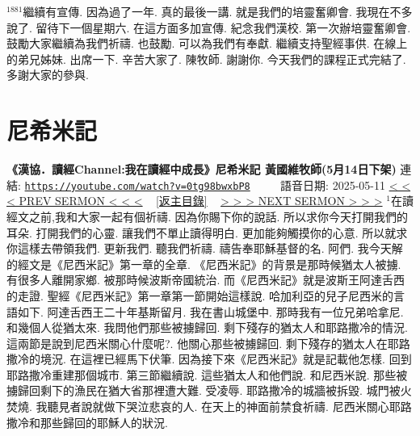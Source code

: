 \documentclass{book}
\begin{document}
$^{1881}$繼續有宣傳.
因為過了一年.
真的最後一講.
就是我們的培靈奮卿會.
我現在不多說了.
留待下一個星期六.
在這方面多加宣傳.
紀念我們漢校.
第一次辦培靈奮卿會.
鼓勵大家繼續為我們祈禱.
也鼓勵.
可以為我們有奉獻.
繼續支持聖經事供.
在線上的弟兄姊妹.
出席一下.
辛苦大家了.
陳牧師.
謝謝你.
今天我們的課程正式完結了.
多謝大家的參與.
\newpage



\section{尼希米記}
\label{sec:0tg98bwxbP8}
\textbf{《漢協．讀經Channel:我在讀經中成長》尼希米記 黃國維牧師(5月14日下架)}
\newline
\newline
連結: \href{https://youtube.com/watch?v=0tg98bwxbP8}{\texttt{https://youtube.com/watch?v=0tg98bwxbP8}} ~~~~ 語音日期: 2025-05-11
\newline
\newline
\hyperref[sec:y7RfxilxFdE]{\small{< < < PREV SERMON < < <}}
~
\hyperref[sec:index]{\small{[返主目錄]}}
~
\hyperref[sec:ToDbLeyWzNI]{\small{> > > NEXT SERMON > > >}}
\newline
\newline
$^{1}$在讀經文之前,我和大家一起有個祈禱.
因為你賜下你的說話.
所以求你今天打開我們的耳朵.
打開我們的心靈.
讓我們不單止讀得明白.
更加能夠觸摸你的心意.
所以就求你這樣去帶領我們.
更新我們.
聽我們祈禱.
禱告奉耶穌基督的名.
阿們.
我今天解的經文是《尼西米記》第一章的全章.
《尼西米記》的背景是那時候猶太人被擄.
有很多人離開家鄉.
被那時候波斯帝國統治.
而《尼西米記》就是波斯王阿達舌西的走證.
聖經《尼西米記》第一章第一節開始這樣說.
哈加利亞的兒子尼西米的言語如下.
阿達舌西王二十年基斯留月.
我在書山城堡中.
那時我有一位兄弟哈拿尼.
和幾個人從猶太來.
我問他們那些被擄歸回.
剩下殘存的猶太人和耶路撒冷的情況.
這兩節是說到尼西米關心什麼呢?.
他關心那些被擄歸回.
剩下殘存的猶太人在耶路撒冷的境況.
在這裡已經馬下伏筆.
因為接下來《尼西米記》就是記載他怎樣.
回到耶路撒冷重建那個城市.
第三節繼續說.
這些猶太人和他們說.
和尼西米說.
那些被擄歸回剩下的漁民在猶大省那裡遭大難.
受凌辱.
耶路撒冷的城牆被拆毀.
城門被火焚燒.
我聽見者說就做下哭泣悲哀的人.
在天上的神面前禁食祈禱.
尼西米關心耶路撒冷和那些歸回的耶穌人的狀況.
\end{document}
